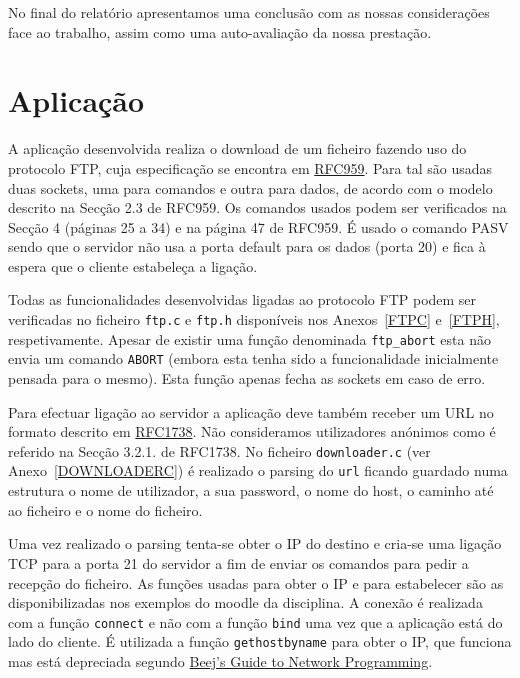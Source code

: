 \documentclass[11pt,a4paper,reqno]{report}
\numberwithin{equation}{section}
\begin{document}
No final do relatório apresentamos uma conclusão com as nossas considerações face ao trabalho, assim como uma auto-avaliação da nossa prestação.


\chapter{Aplicação}

A aplicação desenvolvida realiza o download de um ficheiro fazendo uso do protocolo FTP, cuja especificação se encontra em  \href{https://www.ietf.org/rfc/rfc959.txt}{RFC959}.
Para tal são usadas duas sockets, uma para comandos e outra para dados, de acordo com o modelo descrito na Secção 2.3 de RFC959.
Os comandos usados podem ser verificados na Secção 4 (páginas 25 a 34)  e na página 47 de RFC959. É usado o comando PASV sendo que o servidor não usa a porta default para os dados (porta 20) e fica à espera que o cliente estabeleça a ligação.

Todas as funcionalidades desenvolvidas ligadas ao protocolo FTP podem ser verificadas no ficheiro \verb|ftp.c| e \verb|ftp.h| disponíveis nos Anexos~\ref{FTPC} e~\ref{FTPH}, respetivamente. Apesar de existir uma função denominada \verb|ftp_abort| esta não envia um comando \verb|ABORT| (embora esta tenha sido a funcionalidade inicialmente pensada para o mesmo). Esta função apenas fecha as sockets em caso de erro.

Para efectuar ligação ao servidor a aplicação deve também receber um URL no formato descrito em \href{https://www.ietf.org/rfc/rfc1738.txt}{RFC1738}. Não consideramos utilizadores anónimos como é referido na Secção 3.2.1. de RFC1738. No ficheiro \verb|downloader.c| (ver Anexo~\ref{DOWNLOADERC}) é realizado o parsing do \verb|url| ficando guardado numa estrutura o nome de utilizador, a sua password, o nome do host, o caminho até ao ficheiro e o nome do ficheiro.

Uma vez realizado o parsing tenta-se obter o IP do destino e cria-se uma ligação TCP para a porta 21 do servidor a fim de enviar os comandos para pedir a recepção do ficheiro. As funções usadas para obter o IP e para estabelecer são as disponibilizadas nos exemplos do moodle da disciplina. A conexão é realizada com a função \verb|connect| e não com a função \verb|bind| uma vez que a aplicação está do lado do cliente. É utilizada a função \verb|gethostbyname| para obter o IP, que funciona mas está depreciada segundo \href{http://beej.us/guide/bgnet/output/html/multipage/index.html}{Beej's Guide to Network Programming}.
\end{document}
